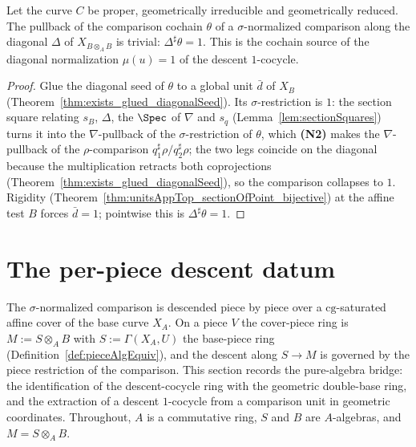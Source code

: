 \begin{theorem}
  \label{thm:normalizedComparison_diagonal_eq_one}
  \leanok
  Let the curve \(C\) be proper, geometrically irreducible and geometrically reduced. The pullback
  of the comparison cochain \(\theta\) of a \(\sigma\)-normalized comparison along the diagonal
  \(\Delta\) of \(X_{B \otimes_A B}\) is trivial: \(\Delta^{\sharp}\theta = 1\). This is the
  cochain source of the diagonal normalization \(\mu(u) = 1\) of the descent \(1\)-cocycle.
\end{theorem}
\begin{proof}
  \leanok
  Glue the diagonal seed of \(\theta\) to a global unit \(\bar d\) of \(X_B\)
  (Theorem~\ref{thm:exists_glued_diagonalSeed}). Its \(\sigma\)-restriction is \(1\): the section
  square relating \(s_B\), \(\Delta\), the \(\Spec\) of \(\nabla\) and \(s_q\)
  (Lemma~\ref{lem:sectionSquares}) turns it into the \(\nabla\)-pullback of the
  \(\sigma\)-restriction of \(\theta\), which \textbf{(N2)} makes the \(\nabla\)-pullback of the
  \(\rho\)-comparison \(q_1^{\sharp}\rho / q_2^{\sharp}\rho\); the two legs coincide on the diagonal
  because the multiplication retracts both coprojections
  (Theorem~\ref{thm:exists_glued_diagonalSeed}), so the comparison collapses to \(1\). Rigidity
  (Theorem~\ref{thm:unitsAppTop_sectionOfPoint_bijective}) at the affine test \(B\) forces \(\bar d
  = 1\); pointwise this is \(\Delta^{\sharp}\theta = 1\).
\end{proof}

\section{The per-piece descent datum}
\label{sec:effectivityDescentDatum}

The \(\sigma\)-normalized comparison is descended piece by piece over a \(\mathrm{cg}\)-saturated
affine cover of the base curve \(X_A\). On a piece \(V\) the cover-piece ring is \(M := S \otimes_A
B\) with \(S := \Gamma(X_A, U)\) the base-piece ring (Definition~\ref{def:pieceAlgEquiv}), and the
descent along \(S \to M\) is governed by the piece restriction of the comparison. This section
records the pure-algebra bridge: the identification of the descent-cocycle ring with the geometric
double-base ring, and the extraction of a descent \(1\)-cocycle from a comparison unit in geometric
coordinates. Throughout, \(A\) is a commutative ring, \(S\) and \(B\) are \(A\)-algebras, and \(M =
S \otimes_A B\).

